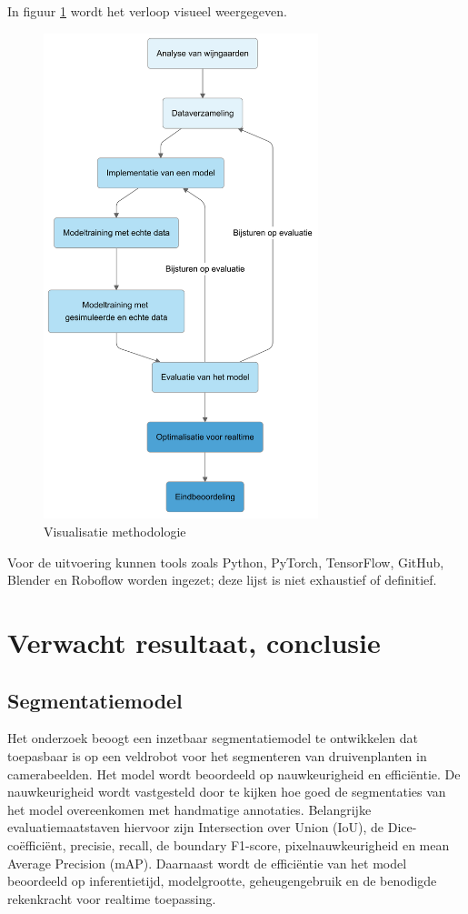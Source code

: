 In figuur \ref{fig:met} wordt het verloop visueel weergegeven.

\begin{figure}[h]
    \includegraphics[width=8cm]{img/verloop.png}
    \caption{Visualisatie methodologie}
    \label{fig:met}
\end{figure}

Voor de uitvoering kunnen tools zoals Python, PyTorch, TensorFlow, GitHub, Blender en Roboflow worden ingezet; deze lijst is niet exhaustief of definitief.

\section{Verwacht resultaat, conclusie}%
\label{sec:verwachte_resultaten}

\subsection{Segmentatiemodel}
Het onderzoek beoogt een inzetbaar segmentatiemodel te ontwikkelen dat toepasbaar is op een veldrobot voor het segmenteren van druivenplanten in camerabeelden. Het model wordt beoordeeld op nauwkeurigheid en efficiëntie. De nauwkeurigheid wordt vastgesteld door te kijken hoe goed de segmentaties van het model overeenkomen met handmatige annotaties. Belangrijke evaluatiemaatstaven hiervoor zijn Intersection over Union (IoU), de Dice-coëfficiënt, precisie, recall, de boundary F1-score, pixelnauwkeurigheid en mean Average Precision (mAP). Daarnaast wordt de efficiëntie van het model beoordeeld op inferentietijd, modelgrootte, geheugengebruik en de benodigde rekenkracht voor realtime toepassing.


